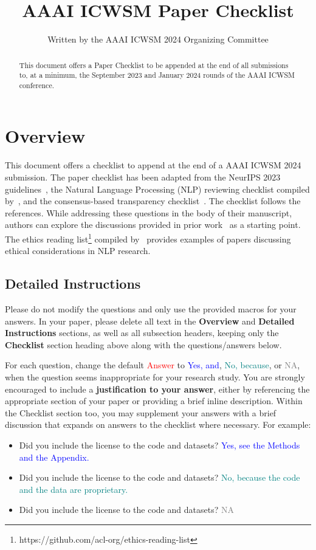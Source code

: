 \documentclass[letterpaper]{article} %
\title{AAAI ICWSM Paper Checklist}
\author{
    Written by the AAAI ICWSM 2024 Organizing Committee}
\newcommand{\answerYes}[1]{\textcolor{blue}{#1}}
\newcommand{\answerNo}[1]{\textcolor{teal}{#1}}
\newcommand{\answerNA}[1]{\textcolor{gray}{#1}}
\newcommand{\answerTODO}[1]{\textcolor{red}{#1}}
\begin{document}
\maketitle

\begin{abstract}
This document offers a Paper Checklist to be appended at the end of all submissions to, at a minimum, the September 2023 and January 2024 rounds of the AAAI ICWSM conference. 
\end{abstract}

\section{Overview}

This document offers a checklist to append at the end of a AAAI ICWSM 2024 submission. The paper checklist has been adapted from the NeurIPS 2023 guidelines~\citep{neurips}, the Natural Language Processing (NLP) reviewing checklist compiled by~\citet{benotti2023understanding}, and the consensus-based transparency checklist~\citep{aczel2020consensus}. The checklist follows the references.  While addressing these questions in the body of their manuscript, authors can explore the discussions provided in prior work~\citep{neurips,aczel2020consensus,benotti2023understanding,ashurst2020guide,gebru2021datasheets} as a starting point. The ethics reading list\footnote{https://github.com/acl-org/ethics-reading-list} compiled by~\citet{benotti2023understanding} provides examples of papers discussing ethical considerations in NLP research.

\subsection{Detailed Instructions}
Please do not modify the questions and only use the provided macros for your answers. In your paper, please delete all text in the \textbf{Overview} and \textbf{Detailed Instructions} sections, as well as all subsection headers, keeping only the \textbf{Checklist} section heading above along with the questions/answers below. 

For each question, change the default \answerTODO{Answer} to \answerYes{Yes, and},
\answerNo{No, because}, or \answerNA{NA}, when the question seems inappropriate for your research study. You are strongly encouraged to include a {\bf
justification to your answer}, either by referencing the appropriate section of your paper or providing a brief inline description. Within the Checklist section too, you may supplement your answers with a brief discussion that expands on answers to the checklist where necessary. For example:
\begin{itemize}
  \item Did you include the license to the code and datasets? \answerYes{Yes, see the Methods and the Appendix.}
  \item Did you include the license to the code and datasets? \answerNo{No, because the code and the data are proprietary.}
  \item Did you include the license to the code and datasets? \answerNA{NA}
\end{itemize}
\end{document}
